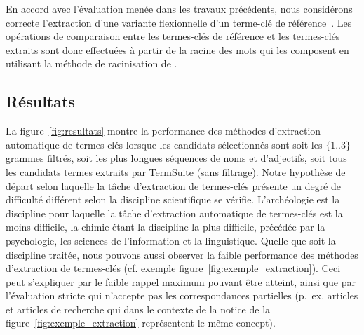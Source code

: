     En accord avec l'évaluation menée dans les travaux précédents, nous
    considérons correcte l'extraction d'une variante flexionnelle d'un terme-clé
    de référence~\cite{kim2010semeval}. Les opérations de comparaison entre les
    termes-clés de référence et les termes-clés extraits sont donc effectuées à
    partir de la racine des mots qui les composent en utilisant la méthode de
    racinisation de .

  \subsection{Résultats}
  \label{subsec:resultats}
    La figure~\ref{fig:resultats} montre la performance des méthodes
    d'extraction automatique de termes-clés lorsque les candidats sélectionnés
    sont soit les $\{1..3\}$-grammes filtrés, soit les plus longues séquences de
    noms et d'adjectifs, soit tous les candidats termes extraits par TermSuite
    (sans filtrage). Notre hypothèse de départ selon laquelle la tâche
    d'extraction de termes-clés présente un degré de difficulté différent selon
    la discipline scientifique se vérifie. L'archéologie est la discipline pour
    laquelle la tâche d'extraction automatique de termes-clés est la moins
    difficile, la chimie étant la discipline la plus difficile, précédée par la
    psychologie, les sciences de l'information et la linguistique. Quelle que
    soit la discipline traitée, nous pouvons aussi observer la faible
    performance des méthodes d'extraction de termes-clés (cf. exemple
    figure~\ref{fig:exemple_extraction}). Ceci peut s'expliquer par le faible
    rappel maximum pouvant être atteint, ainsi que par l'évaluation stricte qui
    n'accepte pas les correspondances partielles (p.~ex. \og{}articles\fg{} et
    \og{}articles de recherche\fg{} qui dans le contexte de la notice de la
    figure~\ref{fig:exemple_extraction} représentent le même concept).


